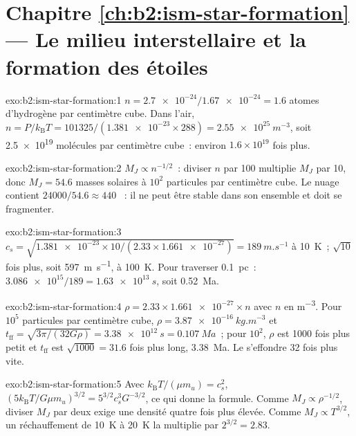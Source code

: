 \section*{Chapitre \ref{ch:b2:ism-star-formation} --- Le milieu interstellaire et la formation des étoiles}

\begin{solution}{exo:b2:ism-star-formation:1}
$n = \num{2.7e-24}/\num{1.67e-24} = 1.6$ atomes d'hydrogène par centimètre cube. Dans l'air,
$n = P/k_{\mathrm B}T = 101325/(\num{1.381e-23}\times288) = \qty{2.55e25}{m^{-3}}$,
soit \num{2.5e19} molécules par centimètre cube~: environ $1.6\times10^{19}$ fois
plus.
\end{solution}

\begin{solution}{exo:b2:ism-star-formation:2}
$M_J \propto n^{-1/2}$~: diviser $n$ par 100 multiplie $M_J$ par 10, donc
$M_J = 54.6$ masses solaires à $10^2$ particules par centimètre cube. Le nuage contient $\num{24000}/54.6 \approx 440$ ~: il ne peut être stable dans son
ensemble et doit se
fragmenter.
\end{solution}

\begin{solution}{exo:b2:ism-star-formation:3}
$c_s = \sqrt{\num{1.381e-23}\times10/(2.33\times\num{1.661e-27})} =
\qty{189}{m.s^{-1}}$ à \qty{10}{K}~; $\sqrt{10}$ fois plus, soit \qty{597}{m.s^{-1}},
à \qty{100}{K}. Pour traverser \qty{0.1}{pc}~: $\num{3.086e15}/189 = \qty{1.63e13}{s}$,
soit \qty{0.52}{Ma}.
\end{solution}

\begin{solution}{exo:b2:ism-star-formation:4}
$\rho = 2.33\times\num{1.661e-27}\times n$ avec $n$ en \unit{m^{-3}}. Pour $10^5$
particules par centimètre cube, $\rho = \qty{3.87e-16}{kg.m^{-3}}$ et
$t_{\mathrm{ff}} = \sqrt{3\pi/(32G\rho)} = \qty{3.38e12}{s} = \qty{0.107}{Ma}$~; pour
$10^2$, $\rho$ est \num{1000} fois plus petit et $t_{\mathrm{ff}}$ est $\sqrt{1000} = 31.6$
fois plus long, \qty{3.38}{Ma}. Le  s'effondre 32 fois plus vite.
\end{solution}

\begin{solution}{exo:b2:ism-star-formation:5}
Avec $k_{\mathrm B}T/(\mu m_u) = c_s^2$, $(5k_{\mathrm B}T/G\mu m_u)^{3/2} =
5^{3/2}c_s^3G^{-3/2}$, ce qui donne la formule. Comme $M_J \propto \rho^{-1/2}$,
diviser $M_J$ par deux exige une densité quatre fois plus élevée. Comme $M_J \propto T^{3/2}$,
un réchauffement de \qty{10}{K} à \qty{20}{K} la multiplie par $2^{3/2} = 2.83$.
\end{solution}

